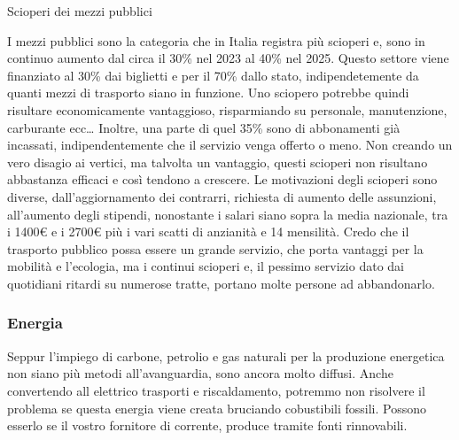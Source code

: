 \documentclass[12pt]{book} %
\begin{document}
\begin{mdframed}[linewidth=1pt]
Scioperi dei mezzi pubblici

I mezzi pubblici sono la categoria che in Italia registra più scioperi e, sono in continuo aumento dal circa il 30\% nel 2023 al 40\% nel 2025. Questo settore viene finanziato al 30\% dai biglietti e per il 70\% dallo stato, indipendetemente da quanti mezzi di trasporto siano in funzione. Uno sciopero potrebbe quindi risultare economicamente vantaggioso, risparmiando su personale, manutenzione, carburante ecc… Inoltre, una parte di quel 35\% sono di abbonamenti già incassati, indipendentemente che il servizio venga offerto o meno. Non creando un vero disagio ai vertici, ma talvolta un vantaggio, questi scioperi non risultano abbastanza efficaci e così tendono a crescere.
Le motivazioni degli scioperi sono diverse, dall'aggiornamento dei contrarri, richiesta di aumento delle assunzioni, all'aumento degli stipendi, nonostante i salari siano sopra la media nazionale, tra i 1400€ e i 2700€ più i vari scatti di anzianità e 14 mensilità. Credo che il trasporto pubblico possa essere un grande servizio, che porta vantaggi per la mobilità e l'ecologia, ma i continui scioperi e, il pessimo servizio dato dai quotidiani ritardi su numerose tratte, portano molte persone ad abbandonarlo.
\end{mdframed}

\subsubsection{Energia}

Seppur l'impiego di carbone, petrolio e gas naturali per la produzione energetica non siano più metodi all'avanguardia, sono ancora molto diffusi. Anche convertendo all elettrico trasporti e riscaldamento, potremmo non risolvere il problema se questa energia viene creata bruciando cobustibili fossili. Possono esserlo se il vostro fornitore di corrente, produce tramite fonti rinnovabili.
\end{document}
